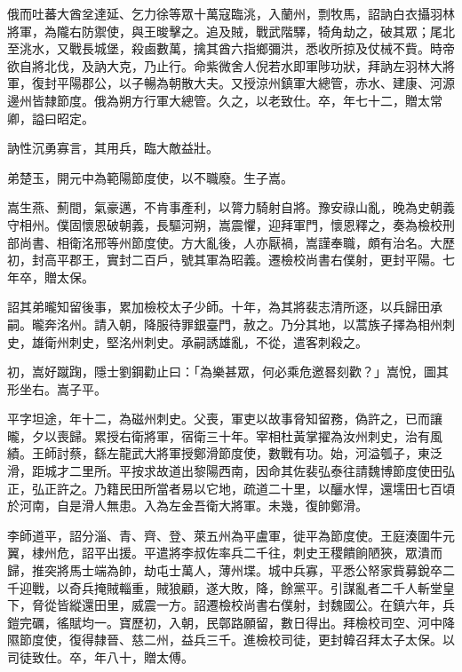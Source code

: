 \begin{pinyinscope}
 俄而吐蕃大酋坌達延、乞力徐等眾十萬寇臨洮，入蘭州，剽牧馬，詔訥白衣攝羽林將軍，為隴右防禦使，與王晙擊之。追及賊，戰武階驛，犄角劫之，破其眾；尾北至洮水，又戰長城堡，殺鹵數萬，擒其酋六指鄉彌洪，悉收所掠及仗械不貲。時帝欲自將北伐，及訥大克，乃止行。命紫微舍人倪若水即軍陟功狀，拜訥左羽林大將軍，復封平陽郡公，以子暢為朝散大夫。又授涼州鎮軍大總管，赤水、建康、河源邊州皆隸節度。俄為朔方行軍大總管。久之，以老致仕。卒，年七十二，贈太常卿，謚曰昭定。



 訥性沉勇寡言，其用兵，臨大敵益壯。



 弟楚玉，開元中為範陽節度使，以不職廢。生子嵩。



 嵩生燕、薊間，氣豪邁，不肯事產利，以膂力騎射自將。豫安祿山亂，晚為史朝義守相州。僕固懷恩破朝義，長驅河朔，嵩震懼，迎拜軍門，懷恩釋之，奏為檢校刑部尚書、相衛洺邢等州節度使。方大亂後，人亦厭禍，嵩謹奉職，頗有治名。大歷初，封高平郡王，實封二百戶，號其軍為昭義。遷檢校尚書右僕射，更封平陽。七年卒，贈太保。



 詔其弟曨知留後事，累加檢校太子少師。十年，為其將裴志清所逐，以兵歸田承嗣。曨奔洺州。請入朝，降服待罪銀臺門，赦之。乃分其地，以蒿族子擇為相州刺史，雄衛州刺史，堅洺州刺史。承嗣誘雄亂，不從，遣客刺殺之。



 初，嵩好蹴踘，隱士劉鋼勸止曰：「為樂甚眾，何必乘危邀晷刻歡？」嵩悅，圖其形坐右。嵩子平。



 平字坦途，年十二，為磁州刺史。父喪，軍吏以故事脅知留務，偽許之，已而讓曨，夕以喪歸。累授右衛將軍，宿衛三十年。宰相杜黃掌擢為汝州刺史，治有風績。王師討蔡，繇左龍武大將軍授鄭滑節度使，數戰有功。始，河溢瓠子，東泛滑，距城才二里所。平按求故道出黎陽西南，因命其佐裴弘泰往請魏博節度使田弘正，弘正許之。乃籍民田所當者易以它地，疏道二十里，以釃水悍，還壖田七百頃於河南，自是滑人無患。入為左金吾衛大將軍。未幾，復帥鄭滑。



 李師道平，詔分淄、青、齊、登、萊五州為平盧軍，徙平為節度使。王庭湊圍牛元翼，棣州危，詔平出援。平遣將李叔佐率兵二千往，刺史王稷饋餉陋狹，眾潰而歸，推突將馬士端為帥，劫屯士萬人，薄州堞。城中兵寡，平悉公帑家貲募銳卒二千迎戰，以奇兵掩賊輜重，賊狼顧，遂大敗，降，餘黨平。引謀亂者二千人斬堂皇下，脅從皆縱還田里，威震一方。詔遷檢校尚書右僕射，封魏國公。在鎮六年，兵鎧完礪，徭賦均一。寶歷初，入朝，民鄣路願留，數日得出。拜檢校司空、河中降隰節度使，復得隸晉、慈二州，益兵三千。進檢校司徒，更封韓召拜太子太保。以司徒致仕。卒，年八十，贈太傅。




\end{pinyinscope}
